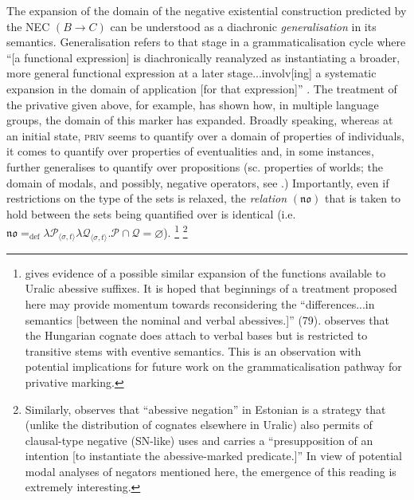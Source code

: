\documentclass[output=paper]{langsci/langscibook}
\begin{document}
The expansion of the domain of the negative existential construction
predicted by the NEC $(B\to C)$ can be understood as a diachronic
\textit{generalisation} in its semantics. Generalisation refers to that
stage in a grammaticalisation cycle where ``[a functional expression] is
diachronically reanalyzed as instantiating a broader, more general
functional expression at a later stage...involv[ing] a systematic expansion
in the domain of application [for that expression]'' \citep[187]{Deo2015}.
The treatment of the privative given above, for example, has shown how, in
multiple language groups, the domain of this marker has expanded. Broadly
speaking, whereas at an initial state, \textsc{priv} seems to quantify over
a domain of properties of individuals\iffalse$\langle\langle e,t\rangle
,\langle\langle e,t\rangle,t\rangle\rangle$\fi, it comes to quantify over
properties of eventualities \iffalse$\langle\langle \mathcal\varepsilon
,t\rangle ,\langle\langle \varepsilon,t\rangle,t\rangle\rangle$\fi and, in
some instances, further generalises to quantify over propositions  (sc.
properties of worlds; the domain of modals, and possibly, negative
operators, see \citealt[34ff]{HornWansing2017}.) Importantly, even if
restrictions on the type of the sets is relaxed, the \textit{relation}
$(\boldsymbol{\mathfrak{n\!o}})$ that is taken to hold between the sets
being quantified over is identical
(i.e.~$\mathfrak{no}=_{\text{def}}\lambda \mathcal
P_{\langle\sigma,t\rangle}\lambda \mathcal
Q_{\langle\sigma,t\rangle}.\mathcal P\cap \mathcal Q=\varnothing$).%
%
\footnote{\citet{Hamari2011-austr} gives evidence of a possible similar expansion of the functions available to Uralic abessive suffixes. It is hoped that beginnings of a treatment proposed here may provide momentum towards reconsidering the ``differences...in semantics [between the nominal and verbal abessives.]'' (79). \citet[609]{Kiefer2015} observes that the Hungarian cognate does attach to verbal bases but is restricted to transitive stems with eventive semantics. This is an observation with potential implications for future work on the grammaticalisation pathway for privative marking.}
\footnote{\label{fn:austr-Tamm}Similarly, \citet[416]{Tamm2015} observes that ``abessive negation'' in Estonian is a strategy that (unlike the distribution of cognates elsewhere in Uralic) also permits of clausal-type negative (SN-like) uses and carries a ``presupposition of an intention [to instantiate the abessive-marked predicate.]'' In view of potential modal analyses of negators mentioned here, the emergence of this reading is extremely interesting.}
\end{document}
